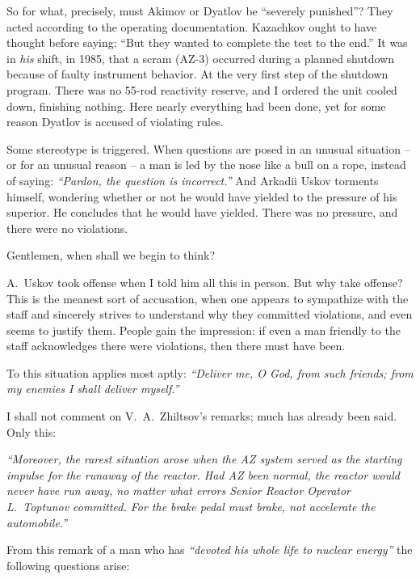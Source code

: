 \documentclass[openright]{bookest}
\begin{document}
So for what, precisely, must Akimov or Dyatlov be ``severely punished''? They acted according to the operating documentation. Kazachkov ought to have thought before saying: ``But they wanted to complete the test to the end.'' It was in \textit{his} shift, in 1985, that a scram (AZ-3) occurred during a planned shutdown because of faulty instrument behavior. At the very first step of the shutdown program. There was no \num{55}-rod reactivity reserve, and I ordered the unit cooled down, finishing nothing. Here nearly everything had been done, yet for some reason Dyatlov is accused of violating rules.

Some stereotype is triggered. When questions are posed in an unusual situation -- or for an unusual reason -- a man is led by the nose like a bull on a rope, instead of saying: \textit{``Pardon, the question is incorrect.''} And Arkadii Uskov torments himself, wondering whether or not he would have yielded to the pressure of his superior. He concludes that he would have yielded. There was no pressure, and there were no violations.

Gentlemen, when shall we begin to think?

A.~Uskov took offense when I told him all this in person. But why take offense? This is the meanest sort of accusation, when one appears to sympathize with the staff and sincerely strives to understand why they committed violations, and even seems to justify them. People gain the impression: if even a man friendly to the staff acknowledges there were violations, then there must have been.

To this situation applies most aptly: \textit{``Deliver me, O God, from such friends; from my enemies I shall deliver myself.''}

I shall not comment on V.~A.~Zhiltsov's remarks; much has already been said. Only this:

\begin{personal}
\textit{``Moreover, the rarest situation arose when the AZ system served as the starting impulse for the runaway of the reactor. Had AZ been normal, the reactor would never have run away, no matter what errors Senior Reactor Operator L.~Toptunov committed. For the brake pedal must brake, not accelerate the automobile.''}
\end{personal}

From this remark of a man who has \textit{``devoted his whole life to nuclear energy''} the following questions arise:
\end{document}
